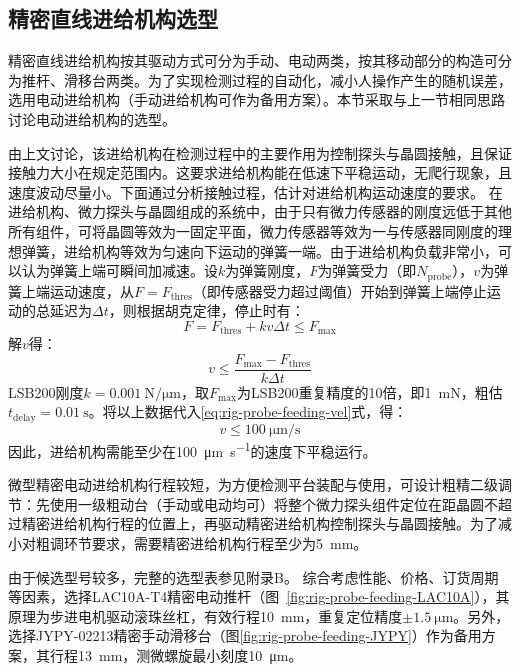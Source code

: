 \clearpage


\subsection{精密直线进给机构选型}\label{sec:rig-probe-feeding}

精密直线进给机构按其驱动方式可分为手动、电动两类，按其移动部分的构造可分为推杆、滑移台两类。为了实现检测过程的自动化，减小人操作产生的随机误差，选用电动进给机构（手动进给机构可作为备用方案）。本节采取与上一节相同思路讨论电动进给机构的选型。

由上文讨论，该进给机构在检测过程中的主要作用为控制探头与晶圆接触，且保证接触力大小在规定范围内。这要求进给机构能在低速下平稳运动，无爬行现象，且速度波动尽量小。下面通过分析接触过程，估计对进给机构运动速度的要求。
在进给机构、微力探头与晶圆组成的系统中，由于只有微力传感器的刚度远低于其他所有组件，可将晶圆等效为一固定平面，微力传感器等效为一与传感器同刚度的理想弹簧，进给机构等效为匀速向下运动的弹簧一端。由于进给机构负载非常小，可以认为弹簧上端可瞬间加减速。设$k$为弹簧刚度，$F$为弹簧受力（即$N_{\mathrm{probe}}$），$v$为弹簧上端运动速度，从$F = F_{\mathrm{thres}}$（即传感器受力超过阈值）开始到弹簧上端停止运动的总延迟为$\Delta t$，则根据胡克定律，停止时有：
\begin{equation}
\label{eq:rig-probe-feeding-force}
F = F_{\mathrm{thres}} + k v \Delta t \leq F_{\max}
\end{equation}
解$v$得：
\begin{equation}
\label{eq:rig-probe-feeding-vel}
v \leq \frac{ F_{\max} - F_{\mathrm{thres}} }
            { k \Delta t }
\end{equation}
LSB200刚度$k = \SI{0.001}{\N\per\um}$，取$F_{\max}$为LSB200重复精度的10倍，即\SI{1}{\mN}，粗估$t_{\mathrm{delay}} = \SI{0.01}{\second}$。将以上数据代入\eqref{eq:rig-probe-feeding-vel}式，得：
\[
v \leq \SI{100}{\um\per\second}
\]
因此，进给机构需能至少在\SI{100}{\um\per\second}的速度下平稳运行。

微型精密电动进给机构行程较短，为方便检测平台装配与使用，可设计粗精二级调节：先使用一级粗动台（手动或电动均可）将整个微力探头组件定位在距晶圆不超过精密进给机构行程的位置上，再驱动精密进给机构控制探头与晶圆接触。为了减小对粗调环节要求，需要精密进给机构行程至少为\SI{5}{\mm}。

由于候选型号较多，完整的选型表参见附录B。
综合考虑性能、价格、订货周期等因素，选择LAC10A-T4精密电动推杆（图~\ref{fig:rig-probe-feeding-LAC10A}），其原理为步进电机驱动滚珠丝杠，有效行程\SI{10}{\mm}，重复定位精度$\pm\SI{1.5}{\um}$。另外，选择JYPY-02213精密手动滑移台（图\ref{fig:rig-probe-feeding-JYPY}）作为备用方案，其行程\SI{13}{\mm}，测微螺旋最小刻度\SI{10}{\um}。

